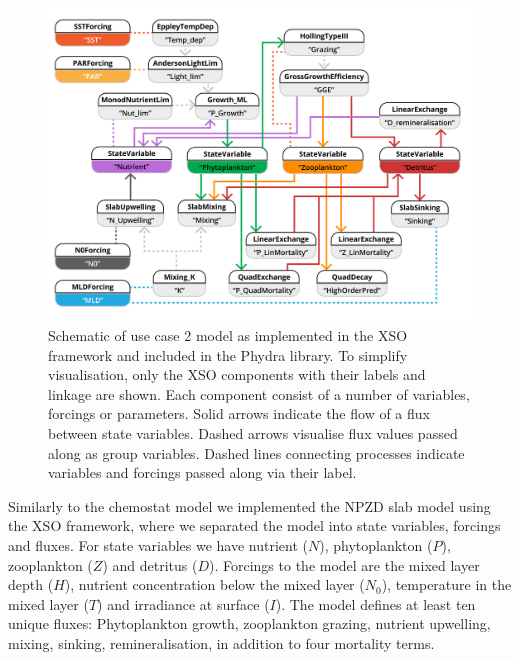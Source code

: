\documentclass[journal abbreviation, manuscript]{copernicus}
\begin{document}
\begin{figure}[t]
\includegraphics[width=15cm]{Figures/firstdraft_schematics/code_schematics/EMPOWER.pdf}
\caption{Schematic of use case 2 model as implemented in the XSO framework and included in the Phydra library. To simplify visualisation, only the XSO components with their labels and linkage are shown. Each component consist of a number of variables, forcings or parameters. Solid arrows indicate the flow of a flux between state variables. Dashed arrows visualise flux values passed along as group variables. Dashed lines connecting processes indicate variables and forcings passed along via their label.}
\label{Figure:CodeSchematics_2}
\end{figure}

Similarly to the chemostat model we implemented the NPZD slab model using the XSO framework, where we separated the model into state variables, forcings and fluxes. For state variables we have nutrient ($N$), phytoplankton ($P$), zooplankton ($Z$) and detritus ($D$). Forcings to the model are the mixed layer depth ($H$), nutrient concentration below the mixed layer ($N_0$), temperature in the mixed layer ($T$) and irradiance at surface ($I$). The model defines at least ten unique fluxes: Phytoplankton growth, zooplankton grazing, nutrient upwelling, mixing, sinking, remineralisation, in addition to four mortality terms.
\end{document}
